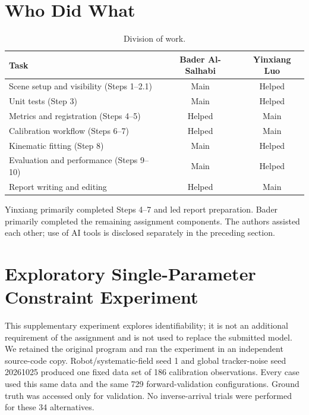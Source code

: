 \documentclass[11pt]{article}
\begin{document}
\section{Who Did What}

\begin{table}[H]
\centering
\caption{Division of work.}
\label{tab:whodidwhat}
\begin{tabular}{@{}lcc@{}}
\toprule
Task & Bader Al-Salhabi & Yinxiang Luo \\
\midrule
Scene setup and visibility (Steps 1--2.1) & Main & Helped \\
Unit tests (Step 3)                      & Main & Helped \\
Metrics and registration (Steps 4--5)    & Helped & Main \\
Calibration workflow (Steps 6--7)        & Helped & Main \\
Kinematic fitting (Step 8)               & Main & Helped \\
Evaluation and performance (Steps 9--10) & Main & Helped \\
Report writing and editing              & Helped & Main \\
\bottomrule
\end{tabular}
\end{table}

Yinxiang primarily completed Steps 4--7 and led report preparation.
Bader primarily completed the remaining assignment components.
The authors assisted each other; use of AI tools is disclosed separately
in the preceding section.

\clearpage
\appendix
\section{Exploratory Single-Parameter Constraint Experiment}
\label{app:fixed-parameters}
This supplementary experiment explores identifiability; it is not an additional requirement of the assignment and is not used to replace the submitted model. We retained the original program and ran the experiment in an independent source-code copy. Robot/systematic-field seed 1 and global tracker-noise seed 20261025 produced one fixed data set of 186 calibration observations. Every case used this same data and the same 729 forward-validation configurations. Ground truth was accessed only for validation. No inverse-arrival trials were performed for these 34 alternatives.
\end{document}
